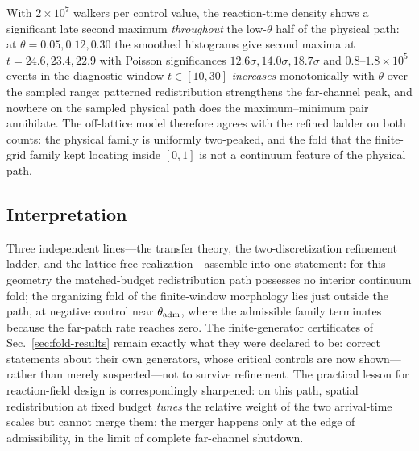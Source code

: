 With \(2\times10^7\) walkers per control value, the reaction-time density
shows a significant late second maximum \emph{throughout} the low-\(\theta\)
half of the physical path: at \(\theta=0.05,0.12,0.30\) the smoothed
histograms give second maxima at \(t=24.6,23.4,22.9\) with Poisson
significances \(12.6\sigma,14.0\sigma,18.7\sigma\) and
\(0.8\)--\(1.8\times10^5\) events in the diagnostic window
\(t\in[10,30]\)%
\emph{increases} monotonically with \(\theta\) over the sampled range:
patterned redistribution strengthens the far-channel peak, and nowhere on
the sampled physical path does the maximum--minimum pair annihilate. The
off-lattice model therefore agrees with the refined ladder on both counts:
the physical family is uniformly two-peaked, and the fold that the
finite-grid family kept locating inside \([0,1]\) is not a continuum
feature of the physical path.

\subsection{Interpretation}
\label{sec:bridge-interpretation}

Three independent lines---the transfer theory, the two-discretization
refinement ladder, and the lattice-free realization---assemble into one
statement: for this geometry the matched-budget redistribution path
possesses no interior continuum fold; the organizing fold of the
finite-window morphology lies just outside the path, at negative control
near \(\theta_{\rm adm}\), where the admissible family terminates because
the far-patch rate reaches zero. The finite-generator certificates of
Sec.~\ref{sec:fold-results} remain exactly what they were declared to be:
correct statements about their own generators, whose critical controls are
now shown---rather than merely suspected---not to survive refinement. The
practical lesson for reaction-field design is correspondingly sharpened:
on this path, spatial redistribution at fixed budget \emph{tunes} the
relative weight of the two arrival-time scales but cannot merge them; the
merger happens only at the edge of admissibility, in the limit of complete
far-channel shutdown.
